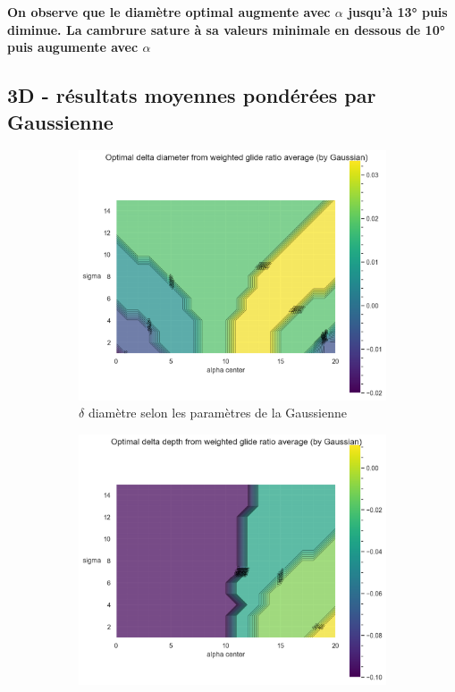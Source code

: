 \textbf{On observe que le diamètre optimal augmente avec $\alpha$ jusqu'à 13° puis diminue. La cambrure sature à sa valeurs minimale en dessous de 10° puis augumente avec $\alpha$ }

\subsection{3D - résultats moyennes pondérées par Gaussienne}
\label{sec:Ch3.3}

\begin{figure}[h!]
    \centering
    \begin{subfigure}[b]{0.45\textwidth}
        \centering
        \includegraphics[width=\linewidth]{Pics/diametre gaussian.png}
        \caption{$\delta$ diamètre selon les paramètres de la Gaussienne}
        \label{fig:diametre gaussien}
    \end{subfigure}
    \hfill
    \begin{subfigure}[b]{0.45\textwidth}
        \centering
        \includegraphics[width=\linewidth]{Pics/depth gaussian.png}

\end{subfigure}
\end{figure}
